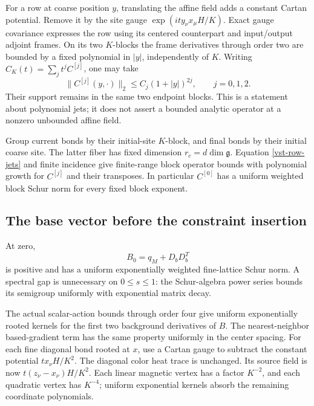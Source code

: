 For a row at coarse position \(y\), translating the
affine field adds a constant Cartan potential. Remove
it by the site gauge \(\exp(i t y_\nu x_\mu H/K)\).
Exact gauge covariance expresses the row using its
centered counterpart and input/output adjoint frames.
On its two \(K\)-blocks the frame derivatives through
order two are bounded by a fixed polynomial in \(|y|\),
independently of \(K\). Writing
\(C_K(t)=\sum_j t^j C^{[j]}\), one may take
\begin{equation}
        \|C^{[j]}(y,\cdot)\|_2
                  \le C_j(1+|y|)^{2j},
                  \qquad j=0,1,2.
 \label{vst-row-jets}
\end{equation}
Their support remains in the same two endpoint blocks.
This is a statement about polynomial jets; it does not
assert a bounded analytic operator at a nonzero unbounded
affine field.

Group current bonds by their initial-site \(K\)-block,
and final bonds by their initial coarse site. The latter
fiber has fixed dimension \(r_c=d\dim\mathfrak g\).
Equation \eqref{vst-row-jets} and finite incidence give
finite-range block operator bounds with polynomial
growth for \(C^{[j]}\) and their transposes.
In particular \(C^{[0]}\) has a uniform weighted block
Schur norm for every fixed block exponent.

\subsection{The base vector before the constraint insertion}
\label{vst-base-section}

At zero,
\[
                 B_0=q_M+D_bD_b^T
\]
is positive and has a uniform exponentially weighted
fine-lattice Schur norm. A spectral gap is unnecessary
on \(0\le s\le1\): the Schur-algebra power series bounds
its semigroup uniformly with exponential matrix decay.

The actual scalar-action bounds through order four
give uniform exponentially rooted kernels for the
first two background derivatives of \(B\).
The nearest-neighbor based-gradient term has the same
property uniformly in the center spacing.
For each fine diagonal bond rooted at \(x\), use a
Cartan gauge to subtract the constant potential
\(t x_\nu H/K^2\). The diagonal color heat trace is
unchanged. Its source field is now
\(t(z_\nu-x_\nu)H/K^2\). Each linear magnetic vertex
has a factor \(K^{-2}\), and each quadratic vertex
has \(K^{-4}\); uniform exponential kernels absorb
the remaining coordinate polynomials.

